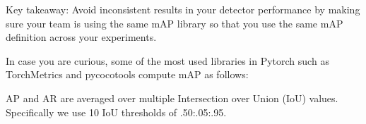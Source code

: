 Key takeaway: Avoid inconsistent results in your detector performance by making sure your team is using the same mAP library so that you use the same mAP definition across your experiments.

In case you are curious, some of the most used libraries in Pytorch such as TorchMetrics and pycocotools compute mAP as follows:

AP and AR are averaged over multiple Intersection over Union (IoU) values. Specifically we use 10 IoU thresholds of .50:.05:.95.